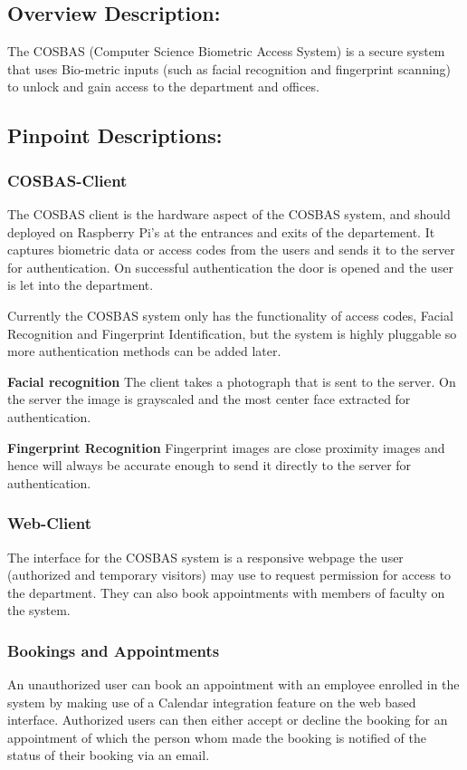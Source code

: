 \subsection{Overview Description:}
	The COSBAS (Computer Science Biometric Access System) is a secure system that uses Bio-metric inputs (such as facial recognition and fingerprint scanning) to unlock and gain access to the department and offices.
	
\subsection{Pinpoint Descriptions:}
	\subsubsection{COSBAS-Client}
	The COSBAS client is the hardware aspect of the COSBAS system, and should deployed on  Raspberry Pi's at the entrances and exits of the departement.  It captures biometric data or access codes from the users and sends it to the server for authentication. On successful authentication the door is opened and the user is let into the department. 
	
	Currently the COSBAS system only has the functionality of access codes, Facial Recognition and Fingerprint Identification, but the system is highly pluggable so more  authentication methods can be added later. 
	
	\textbf{Facial recognition}
	The client takes a photograph that is sent to the server. On the server the image is grayscaled and the most center face extracted for authentication. 
	
	\textbf{Fingerprint Recognition}
	Fingerprint images are close proximity images and hence will always be accurate enough to send it directly to the server for authentication.
	
	\subsubsection{Web-Client}
	The interface for the COSBAS system is a responsive webpage the user (authorized and temporary visitors) may use to request permission for access to the department. They can also book appointments with members of faculty on the system.
	
	\subsubsection{Bookings and Appointments}
	An unauthorized user can book an appointment with an employee enrolled in the system by making use of a Calendar integration feature on the web based interface. Authorized users can then either accept or decline the booking for an appointment of which the person whom made the booking is notified of the status of their booking via an email.
	
